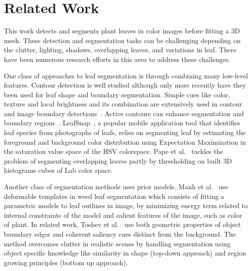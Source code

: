 \section{Related Work}
\label{sec:related}




This work detects and segments plant leaves in color images before fitting a $3$D mesh.  These detection and segmentation tasks can be challenging depending on the clutter, lighting, shadows, overlapping leaves, and variations in leaf.  There have been numerous research efforts in this area to address these challenges.

One class of approaches to leaf segmentation is through combining many low-level features.  Contour detection is well studied although only more recently have they been used for leaf shape and boundary segmentation.  Simple cues like color, texture and local brightness and its combination are extensively used in contour and image boundary detections~\cite{martin2004learning,valliammal2012leaf}.  Active contours can enhance segmentation and boundary regions~\cite{mishra2011decoupled}. LeafSnap~\cite{kumar2012leafsnap}, a popular mobile application tool that identifies leaf species from photographs of leafs, relies on  segmenting leaf by estimating the foreground and background color distribution using Expectation Maximization in the saturation value space of the HSV colorspace.  Pape et al.~\cite{Pape2015} tackles the problem of segmenting overlapping leaves partly by thresholding on built 3D histograms cubes of Lab color space.

Another class of segmentation methods uses prior models.  Manh et al.~\cite{Manh2001139} use deformable templates in weed leaf segmentation which consists of fitting a parametric models to leaf outlines in image, by minimizing energy term related to internal constraints of the model and salient features of the image, such as color of plant. In related work, Toshev et al.~\cite{toshev2012shape} use both geometric properties of object boundary edges and coherent saliency cues distinct from the background. The method overcomes clutter in realistic scenes by handling segmentation using object specific knowledge like similarity in shape (top-down approach) and region growing principles (bottom up approach).  

